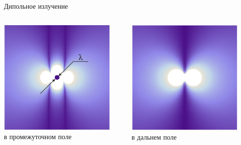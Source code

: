 \documentclass[9pt, compress, xcolor=table]{beamer}
\begin{document}
\begin{frame}{Дипольное излучение}
\begin{columns}[c]
\column{4cm}
\centering
\includegraphics[width=0.9\textwidth]{mid}
\\\scriptsize{в промежуточном поле}

\column{4cm}
\centering
\includegraphics[width=0.9\textwidth]{far}
\\\scriptsize{в дальнем поле}


\end{columns}

\end{frame}
\end{document}
